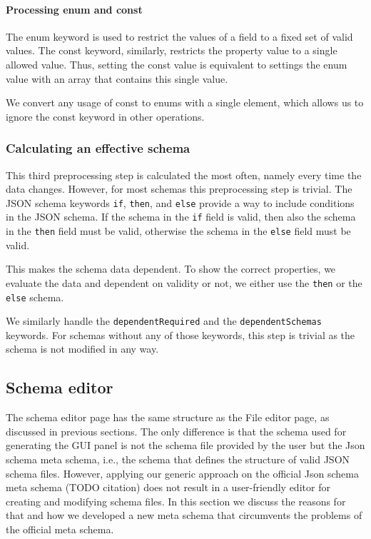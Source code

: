 \paragraph{Processing enum and const}
The enum keyword is used to restrict the values of a field to a fixed set of valid values.
The const keyword, similarly, restricts the property value to a single allowed value.
Thus, setting the const value is equivalent to settings the enum value with an array that contains this single value.

We convert any usage of const to enums with a single element, which allows us to ignore the const keyword in other operations.

\subsubsection{Calculating an effective schema}

This third preprocessing step is calculated the most often, namely every time the data changes.
However, for most schemas this preprocessing step is trivial.
The JSON schema keywords \texttt{if}, \texttt{then}, and \texttt{else} provide a way to include conditions in the JSON schema.
If the schema in the \texttt{if} field is valid, then also the schema in the \texttt{then} field must be valid, otherwise the
schema in the \texttt{else} field must be valid.

This makes the schema data dependent.
To show the correct properties, we evaluate the data and dependent on validity or not, we either use the \texttt{then} or the \texttt{else} schema.

We similarly handle the \texttt{dependentRequired} and the \texttt{dependentSchemas} keywords.
For schemas without any of those keywords, this step is trivial as the schema is not modified in any way.


\subsection{Schema editor}\label{subsec:schema-editor}

The schema editor page has the same structure as the File editor page, as discussed in previous sections.
The only difference is that the schema used for generating the GUI panel is not the schema file provided by the user but the Json schema meta schema,
i.e., the schema that defines the structure of valid JSON schema files.
However, applying our generic approach on the official Json schema meta schema (TODO citation) does not result in a user-friendly editor for
creating and modifying schema files.
In this section we discuss the reasons for that and how we developed a new meta schema that circumvents the problems of the official meta schema.

